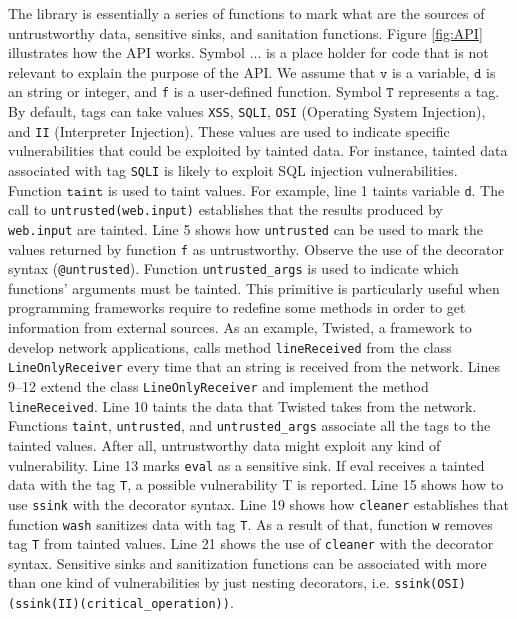 \documentclass[oribibl]{llncs}
\begin{document}
The library is essentially a series of functions 
to mark  
what are the sources of untrustworthy data, sensitive sinks, and
sanitation functions. 
Figure \ref{fig:API} illustrates how the API works.
Symbol $\texttt{...}$ is a place holder for code that 
is not relevant to explain the purpose of the API.
We assume that $\texttt{v}$ is a variable, $\texttt{d}$ is an
string or integer, and \texttt{f} is a user-defined function. Symbol
$\texttt{T}$ represents a tag. 
By default, tags can take values  
\texttt{XSS}, \texttt{SQLI}, \texttt{OSI} (Operating System Injection), and
\texttt{II} (Interpreter Injection).
These values are used to indicate specific vulnerabilities that 
could be exploited by tainted data.
For instance, 
tainted data associated with tag \texttt{SQLI} is likely to exploit 
SQL injection vulnerabilities.
Function $\texttt{taint}$ is used to taint values. 
For example, line 1 taints variable \texttt{d}.
The call to \texttt{untrusted(web.input)} 
establishes that the results produced by \texttt{web.input} are tainted.
Line 5 shows how \texttt{untrusted} can be used  to mark 
the values returned by function \texttt{f}
as untrustworthy. Observe the use of the decorator syntax
 (\texttt{@untrusted}).
Function  
\texttt{untrusted\_args} is used to indicate which functions' arguments must be
tainted. This primitive is particularly useful 
when programming frameworks require 
to redefine some methods in order to get information from  
external sources. 
As an example, Twisted\cite{Twisted}, a framework to 
develop network applications, 
calls method \texttt{lineReceived} from the class
\texttt{LineOnlyReceiver} 
every time that an string is received from the network.
Lines 9--12 extend the class \texttt{LineOnlyReceiver}
and implement the method \texttt{lineReceived}. 
Line 10 taints the data that Twisted takes 
from the network. 
Functions \texttt{taint}, \texttt{untrusted}, and
\texttt{untrusted\_args} associate all the tags to the
tainted values. After all, 
untrustworthy data might exploit any kind of vulnerability. 
Line 13 marks \texttt{eval} as a sensitive sink. If eval receives 
a tainted data with the tag \texttt{T},
a possible vulnerability T is reported. Line 15 shows how to 
use \texttt{ssink} with the decorator syntax. 
Line 19 shows how \texttt{cleaner} establishes that 
function \texttt{wash} sanitizes data with tag \texttt{T}. 
As a result of that, function \texttt{w} removes tag \texttt{T}
from tainted values. Line 21 shows the use
of \texttt{cleaner} with the decorator syntax.
{Sensitive sinks and sanitization functions
can be associated with more than one kind of vulnerabilities 
by just nesting decorators,
i.e. \texttt{ssink(OSI)(ssink(II)(critical\_operation))}}.
\end{document}
